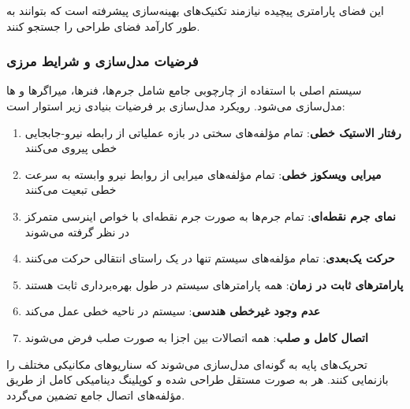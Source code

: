 این فضای پارامتری پیچیده نیازمند تکنیک‌های بهینه‌سازی پیشرفته است که بتوانند به طور کارآمد فضای طراحی را جستجو کنند.
\subsubsection{فرضیات مدل‌سازی و شرایط مرزی}
سیستم اصلی  با استفاده از چارچوبی جامع شامل جرم‌ها، فنرها، میراگرها و ها مدل‌سازی می‌شود. رویکرد مدل‌سازی بر فرضیات بنیادی زیر استوار است:

\begin{enumerate}
    \item \textbf{رفتار الاستیک خطی}: تمام مؤلفه‌های سختی در بازه عملیاتی از رابطه نیرو-جابجایی خطی پیروی می‌کنند
    \item \textbf{میرایی ویسکوز خطی}: تمام مؤلفه‌های میرایی از روابط نیرو وابسته به سرعت خطی تبعیت می‌کنند
    \item \textbf{نمای جرم نقطه‌ای}: تمام جرم‌ها به صورت جرم نقطه‌ای با خواص اینرسی متمرکز در نظر گرفته می‌شوند
    \item \textbf{حرکت یک‌بعدی}: تمام مؤلفه‌های سیستم تنها در یک راستای انتقالی حرکت می‌کنند
    \item \textbf{پارامترهای ثابت در زمان}: همه پارامترهای سیستم در طول بهره‌برداری ثابت هستند
    \item \textbf{عدم وجود غیرخطی هندسی}: سیستم در ناحیه خطی عمل می‌کند
    \item \textbf{اتصال کامل و صلب}: همه اتصالات بین اجزا به صورت صلب فرض می‌شوند
\end{enumerate}

تحریک‌های پایه به گونه‌ای مدل‌سازی می‌شوند که سناریوهای مکانیکی مختلف را بازنمایی کنند. هر  به صورت مستقل طراحی شده و کوپلینگ دینامیکی کامل از طریق مؤلفه‌های اتصال جامع تضمین می‌گردد.
